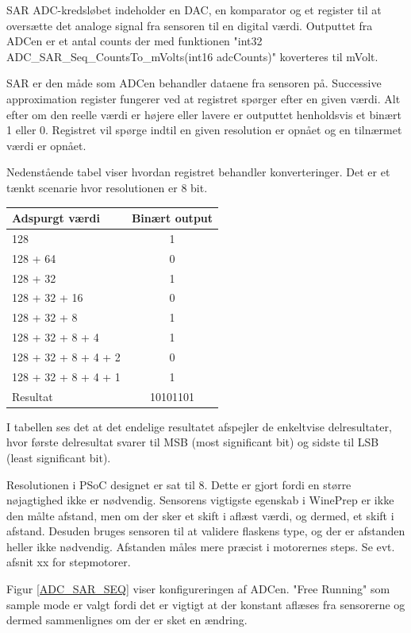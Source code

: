 SAR ADC-kredsløbet indeholder en DAC, en komparator og et register til at oversætte det analoge signal fra sensoren til en digital værdi. Outputtet fra ADCen er et antal counts der med funktionen "int32 ADC_SAR_Seq_CountsTo_mVolts(int16 adcCounts)" koverteres til mVolt.

SAR er den måde som ADCen behandler dataene fra sensoren på. Successive approximation register fungerer ved at registret spørger efter en given værdi. Alt efter om den reelle værdi er højere eller lavere er outputtet henholdsvis et binært 1 eller 0. Registret vil spørge indtil en given resolution er opnået og en tilnærmet værdi er opnået.

Nedenstående tabel viser hvordan registret behandler konverteringer. Det er et tænkt scenarie hvor resolutionen er 8 bit.

\begin{table}
\begin{tabular}{| l | c |}
Adspurgt værdi & Binært output\\\hline
128 & 1\\\hline
128 + 64 & 0\\\hline
128 + 32 & 1\\\hline
128 + 32 + 16 & 0\\\hline
128 + 32 + 8 & 1\\\hline
128 + 32 + 8 + 4 & 1\\\hline
128 + 32 + 8 + 4 + 2 & 0\\\hline
128 + 32 + 8 + 4 + 1 & 1\\\hline
Resultat & 10101101\\\hline
\end{tabular}
\end{table}

I tabellen ses det at det endelige resultatet afspejler de enkeltvise delresultater, hvor første delresultat svarer til MSB (most significant bit) og sidste til LSB (least significant bit).

Resolutionen i PSoC designet er sat til 8. Dette er gjort fordi en større nøjagtighed ikke er nødvendig. Sensorens vigtigste egenskab i WinePrep er ikke den målte afstand, men om der sker et skift i aflæst værdi, og dermed, et skift i afstand. Desuden bruges sensoren til at validere flaskens type, og der er afstanden heller ikke nødvendig. Afstanden måles mere præcist i motorernes steps. Se evt. afsnit xx for stepmotorer.

Figur \ref{ADC_SAR_SEQ} viser konfigureringen af ADCen. "Free Running" som sample mode er valgt fordi det er vigtigt at der konstant aflæses fra sensorerne og dermed sammenlignes om der er sket en ændring.

